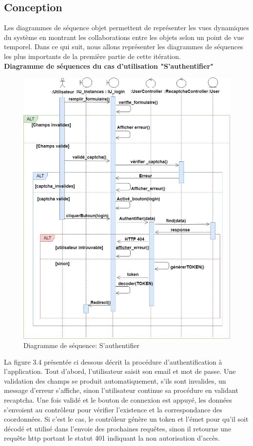 \subsection{Conception} 
Les diagrammes de séquence objet permettent de représenter les vues dynamiques du système en montrant les
collaborations entre les objets selon un point de vue temporel. Dans ce qui suit, nous allons
représenter les diagrammes de séquences les plus importants de la première partie de cette itération.\\
\textbf{Diagramme de séquences  du cas d'utilisation  "S'authentifier"}\\
\begin{figure}[H]
	\centering
	\includegraphics[scale=0.5]{login1.jpg}
	\caption{Diagramme de séquence: S'authentifier}
	\label{Diagramme de séquence: S'authentifier}
\end{figure} 

La figure 3.4  présentée ci dessous décrit la  procédure d'authentification à l'application. Tout d'abord,  l'utilisateur saisit son email et mot de passe. Une validation des champs se produit automatiquement, s'ils sont  invalides, un message d'erreur s'affiche, sinon  l'utilisateur continue sa procédure en validant recaptcha. Une fois validé et le bouton de connexion est appuyé,  les données s'envoient au contrôleur pour vérifier l'existence et la correspondance des coordonnées. Si c'est le cas, le contrôleur génère un token et l'émet pour qu'il soit décodé et utilisé dans l'envoie des prochaines requêtes, sinon il retourne une requête http portant le statut 401 indiquant la non autorisation d'accès.


